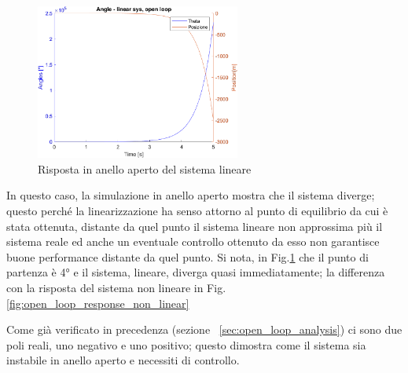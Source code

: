 \begin{figure}[H]
	\centering   	
	\includegraphics[width=0.6\textwidth]{Immagini/linear_open_loop.png}
	\caption{Risposta in anello aperto del sistema lineare}
	\label{fig:open_loop_response}
\end{figure}
In questo caso, la simulazione in anello aperto mostra che il sistema diverge; questo perché la linearizzazione ha senso attorno al punto di equilibrio da cui è stata ottenuta, distante da quel punto il sistema lineare non approssima più il sistema reale ed anche un eventuale controllo ottenuto da esso non garantisce buone performance distante da quel punto. Si nota, in Fig.\ref{fig:open_loop_response} che il punto di partenza è 4° e il sistema, lineare, diverga quasi immediatamente; la differenza con la risposta del sistema non lineare in Fig.\ref{fig:open_loop_response_non_linear}

Come già verificato in precedenza (sezione ~\ref{sec:open_loop_analysis}) ci sono due poli reali, uno negativo e uno positivo; questo dimostra come il sistema sia instabile in anello aperto e necessiti di controllo.

